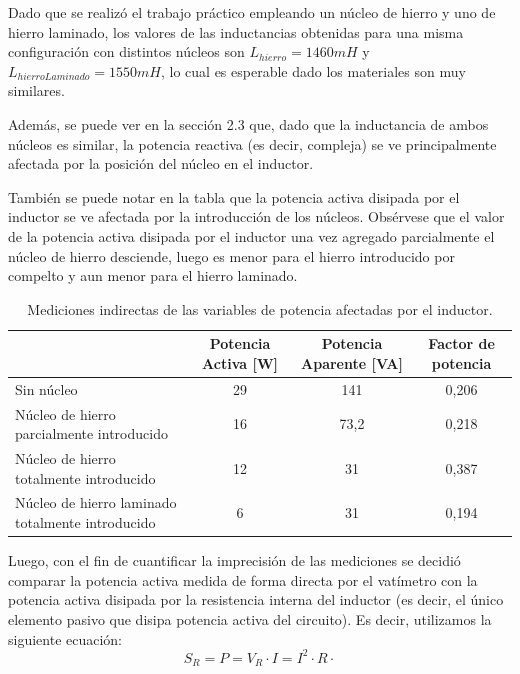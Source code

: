 \documentclass{article}
\begin{document}
            Dado que se realizó el trabajo práctico empleando un núcleo de hierro y uno de hierro laminado, los valores
            de las inductancias obtenidas para una misma configuración con distintos núcleos son $L_{hierro} = 1460 mH$
            y $L_{hierroLaminado} = 1550 mH$, lo cual es esperable dado los materiales son muy similares.

            Además, se puede ver en la sección 2.3 que, dado que la inductancia de ambos núcleos es similar, la potencia
            reactiva (es decir, compleja) se ve principalmente afectada por la posición del núcleo en el inductor.
            \par También se puede notar en la tabla que la potencia activa disipada por el inductor se ve afectada por 
            la introducción de los núcleos. Obsérvese que el valor de la potencia activa disipada por el inductor una vez agregado
            parcialmente el núcleo de hierro desciende, luego es menor para el hierro introducido por compelto y aun menor para el
            hierro laminado.

            \begin{table}[h]
                \begin{tabular}{|p{5cm}|c|c|c|}
                \hline
                                                    &Potencia Activa [W]   & Potencia Aparente [VA] & Factor de potencia \\ \hline
                Sin núcleo                                &  29                      & 141 & 0,206    \\ \hline
                Núcleo de hierro parcialmente introducido     &      16                  & 73,2        & 0,218  \\ \hline           
                Núcleo de hierro totalmente introducido       &     12               & 31          & 0,387    \\ \hline           
                Núcleo de hierro laminado totalmente introducido & 6               & 31 & 0,194  \\ \hline
                \end{tabular}
                \caption{Mediciones indirectas de las variables de potencia afectadas por el inductor.}
                \label{tab:MedicionesIndirectas}
            \end{table}


            Luego, con el fin de cuantificar la imprecisión de las mediciones se decidió comparar la potencia activa
            medida de forma directa por el vatímetro con la potencia activa disipada por la resistencia interna del inductor
            (es decir, el único elemento pasivo que disipa potencia activa del circuito). Es decir, utilizamos la siguiente
             ecuación:
            \begin{equation}
               S_R = P = V_R \cdot I = I^2 \cdot R \cdot
             \end{equation}
\end{document}
